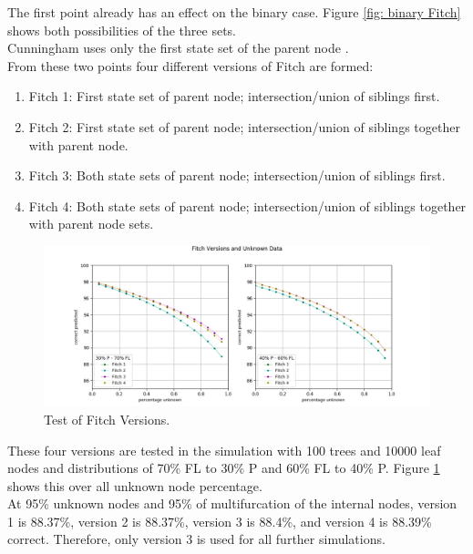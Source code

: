       The first point already has an effect on the binary case. Figure \ref{fig: binary Fitch} shows 
        both possibilities of the three sets. \\
      Cunningham uses only the first state set of the parent node \cite{Cunningham1998}. \\
      From these two points four different versions of Fitch are formed:
      \begin{enumerate}
        \item Fitch 1: First state set of parent node; intersection/union of siblings first.
        \item Fitch 2: First state set of parent node; intersection/union of siblings together with parent node.
        \item Fitch 3: Both state sets of parent node; intersection/union of siblings first.
        \item Fitch 4: Both state sets of parent node; intersection/union of siblings together with parent node sets.
      \end{enumerate}

      \begin{figure}[h!]
        \centering
        \includegraphics[trim = 24mm 0mm 28mm 14mm, clip, width=\textwidth]{Figures/simulation_fitch_evaluation.png}
        \caption{Test of Fitch Versions. }
        \label{fig:Fitch versions}
      \end{figure}
      These four versions are tested in the simulation with 100 trees and 10000 leaf nodes and
        distributions of 70\% FL to 30\% P and 60\% FL to 40\% P. Figure \ref{fig:Fitch versions} shows 
        this over all unknown node percentage. \\
      At 95\% unknown nodes and 95\% of multifurcation of the internal nodes, version 1 is 88.37\%, 
        version 2 is 88.37\%, version 3 is 88.4\%, and version 4 is 88.39\% correct. Therefore, 
        only version 3 is used for all further simulations.
        
